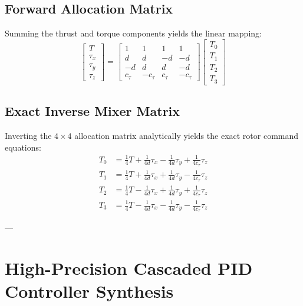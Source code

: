 \documentclass[11pt,a4paper]{article}
\begin{document}
\subsection{Forward Allocation Matrix}
Summing the thrust and torque components yields the linear mapping:
\begin{equation}
\begin{bmatrix} T \\ \tau_x \\ \tau_y \\ \tau_z \end{bmatrix} =
\begin{bmatrix}
1 & 1 & 1 & 1 \\
d & d & -d & -d \\
-d & d & d & -d \\
c_\tau & -c_\tau & c_\tau & -c_\tau
\end{bmatrix}
\begin{bmatrix} T_0 \\ T_1 \\ T_2 \\ T_3 \end{bmatrix}
\end{equation}

\subsection{Exact Inverse Mixer Matrix}
Inverting the $4 \times 4$ allocation matrix analytically yields the exact rotor command equations:
\begin{equation}
\boxed{
\begin{aligned}
T_0 &= \frac{1}{4}T + \frac{1}{4d}\tau_x - \frac{1}{4d}\tau_y + \frac{1}{4c_\tau}\tau_z \\
T_1 &= \frac{1}{4}T + \frac{1}{4d}\tau_x + \frac{1}{4d}\tau_y - \frac{1}{4c_\tau}\tau_z \\
T_2 &= \frac{1}{4}T - \frac{1}{4d}\tau_x + \frac{1}{4d}\tau_y + \frac{1}{4c_\tau}\tau_z \\
T_3 &= \frac{1}{4}T - \frac{1}{4d}\tau_x - \frac{1}{4d}\tau_y - \frac{1}{4c_\tau}\tau_z
\end{aligned}
}
\end{equation}

---

\section{High-Precision Cascaded PID Controller Synthesis}
\end{document}

